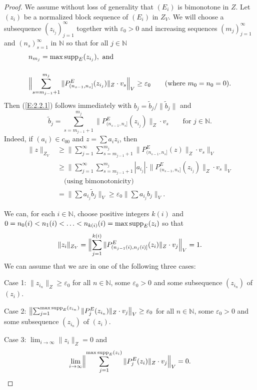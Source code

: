 \documentclass[11pt,leqno]{amsart}
\theoremstyle{definition}
\newcommand{\N}{\mathbb{N}}
\newcommand{\vp}{\varepsilon}
\newcommand{\supp}{{\rm supp}}
\begin{document}
\begin{proof} We assume without loss of generality that $(E_i)$  is
 bimonotone in $Z$.
 Let $(z_i)$ be  a normalized block sequence of $(E_i)$ in $Z_V$.
We will choose a subsequence
$(z_{i_j})_{j=1}^\infty$ together
with $\vp_0>0$ and increasing sequences $(m_j)_{j=1}^\infty$ and
$(n_s)_{s=1}^\infty$ in $\N$ so that for all $j\in \N$
\begin{eqnarray}
  \label{E:2.2.2}
  & n_{m_j}=\max\supp_E(z_{i_j}), \text{ and }&\\[3ex]
  \label{E:2.2.3}
  & \Bigl\|\sum_{s=m_{j-1}+1}^{m_j}\|
  P^E_{(n_{s-1},n_s]}(z_{i_j})\|_Z\cdot v_s\Bigr\|_V\ge \vp_0 &
    \text{\hspace{1em}(where $m_0=n_0=0$).}
\end{eqnarray}
Then (\ref{E:2.2.1}) follows immediately with
$b_j=\tilde b_j/\| \tilde b_j\|$ and
$$\tilde b_j=\sum_{s=m_{j-1}+1}^{m_j}\|
P^E_{(n_{s-1},n_s]}(z_{i_j})\|_Z\cdot v_s\qquad\text{for $j\in \N$.}$$
Indeed, if $(a_i)\in c_{00}$ and $z=\sum a_i z_i$, then
\begin{align*}
\|z\|_{Z_V}&\ge \Big\| \sum_{j=1}^\infty \sum_{s=m_{j-1}+1}^{m_j}
\|P^E_{(n_{s-1},n_s]}(z)\|_Z\cdot v_s\Big\|_V\\
  & \ge \Big\| \sum_{j=1}^\infty \sum_{s=m_{j-1}+1}^{m_j} |a_{i_j}|\cdot
  \|P^E_{(n_{s-1},n_s]}(z_{i_j})\|_Z\cdot v_s\Big\|_V\\
&\quad\text{(using bimonotonicity)}\\
&= \Big\| \sum a_{i_j} \tilde b_j\Big\|_V
\ge  \vp_0\Big\| \sum a_{i_j} b_j  \Big\|_V.
\end{align*}

We can, for each $i\in\N$, choose positive integers
$k(i)$ and $0=n_0{(i)}<n_1{(i)}<\ldots<n_{k(i)}{(i)}=\max\supp_E(z_i)$ so that
\begin{equation}\label{E:2.2.3a}
  \|z_i\|_{Z_V}=
  \Bigl\|\sum_{j=1}^{k(i)}\| P^E_{(n_{j-1}{(i)},n_j{(i)}]}(z_i)\|_Z
    \cdot v_j \Big\|_V=1.
\end{equation}
We can assume that we are in one of the following three cases:

\noindent Case 1: $\|z_{i_n}\|_Z\ge \vp_0$ for all $n\in\N$, some
$\vp_0>0$ and some subsequence $(z_{i_n})$ of $(z_i)$.

\noindent Case 2: $\bigl\|\sum_{j=1}^{\max\supp_E(z_{i_n})} \|
P^E_{j}(z_{i_n})\|_Z \cdot v_j\bigr\|_V\ge \vp_0$ for all $n\in\N$,
some $\vp_0>0$ and some subsequence $(z_{i_n})$ of $(z_i)$.

\noindent Case 3:  $\lim_{i\to\infty}\|z_i\|_Z=0$ and
$$\lim_{i\to\infty} \Bigl\|\sum_{j=1}^{\max\supp_E(z_i)}
\| P^E_{j}(z_i)\|_Z\cdot v_j\Bigr\|_V=0.$$


\end{proof}
\end{document}
